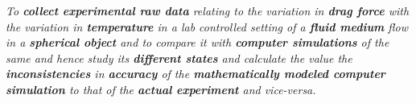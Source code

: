 \textit{To \textbf{collect experimental raw data} relating to the variation in \textbf{drag force} with the variation in \textbf{temperature} in a lab controlled setting of a \textbf{fluid medium} flow in a \textbf{spherical object} and to compare it with \textbf{computer simulations} of the same and hence study its \textbf{different states} and calculate the value the \textbf{inconsistencies} in \textbf{accuracy} of the \textbf{mathematically modeled computer simulation} to that of the \textbf{actual experiment} and vice-versa.}

